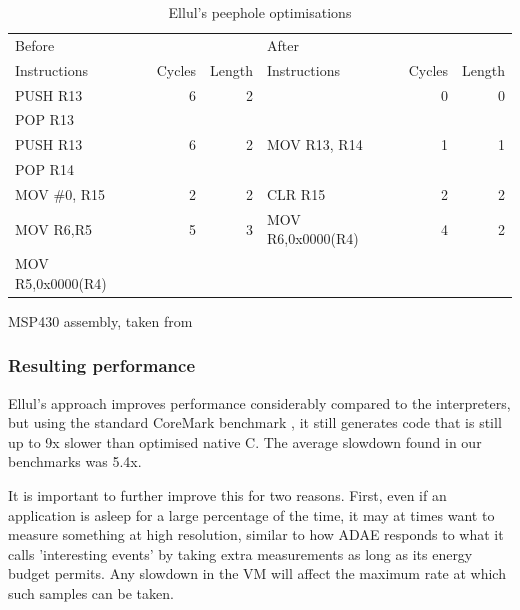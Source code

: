 \begin{table}[]
\centering
\caption{Ellul's peephole optimisations}
\label{tbl-ellul-peephole}
\begin{threeparttable}
\begin{tabular}{lrrlrr}
\toprule
Before &  &  & After &  & \\
Instructions      & Cycles & Length & Instructions      & Cycles & Length \\
\midrule
\midrule
PUSH R13          & 6      & 2      &                   & 0      & 0 \\
POP R13           &        &        &                   &        & \\
\midrule
PUSH R13          & 6      & 2      & MOV R13, R14      & 1      & 1 \\
POP R14           &        &        &                   &        & \\
\midrule
MOV \#0, R15      & 2      & 2      & CLR R15           & 2      & 2 \\
\midrule
MOV R6,R5         & 5      & 3      & MOV R6,0x0000(R4) & 4      & 2 \\
MOV R5,0x0000(R4) &        &        &                   &        & \\
\bottomrule
\end{tabular}
\begin{tablenotes}
\item MSP430 assembly, taken from \cite{Ellul:2012thesis}
\end{tablenotes}
\end{threeparttable}
\end{table}


\subsubsection{Resulting performance}
Ellul's approach improves performance considerably compared to the interpreters, but using the standard CoreMark benchmark \cite{coremark}, it still generates code that is still up to 9x slower than optimised native C. The average slowdown found in our benchmarks was 5.4x.

It is important to further improve this for two reasons. First, even if an application is asleep for a large percentage of the time, it may at times want to measure something at high resolution, similar to how ADAE \cite{Chang:2010ek} responds to what it calls 'interesting events' by taking extra measurements as long as its energy budget permits. Any slowdown in the VM will affect the maximum rate at which such samples can be taken.

